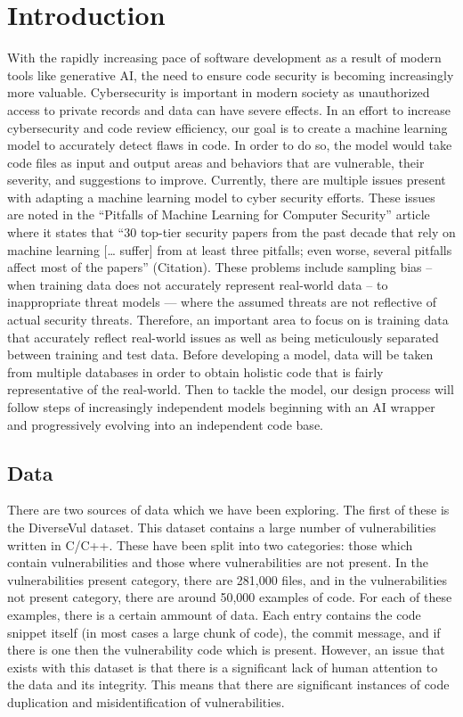\documentclass{article}
\begin{document}
\section{Introduction}
With the rapidly increasing pace of software development as a result of modern tools like generative AI, the need to ensure code security is becoming increasingly more valuable. Cybersecurity is important in modern society as unauthorized access to private records and data can have severe effects. In an effort to increase cybersecurity and code review efficiency, our goal is to create a machine learning model to accurately detect flaws in code. In order to do so, the model would take code files as input and output areas and behaviors that are vulnerable, their severity, and suggestions to improve. Currently, there are multiple issues present with adapting a machine learning model to cyber security efforts. These issues are noted in the “Pitfalls of Machine Learning for Computer Security” article where it states that “30 top-tier security papers from the past decade that rely on machine learning [… suffer] from at least three pitfalls; even worse, several pitfalls affect most of the papers” (Citation). These problems include sampling bias – when training data does not accurately represent real-world data – to inappropriate threat models — where the assumed threats are not reflective of actual security threats. Therefore, an important area to focus on is training data that accurately reflect real-world issues as well as being meticulously separated between training and test data. Before developing a model, data will be taken from multiple databases in order to obtain holistic code that is fairly representative of the real-world. Then to tackle the model, our design process will follow steps of increasingly independent models beginning with an AI wrapper and progressively evolving into an independent code base.


\subsection{Data}
There are two sources of data which we have been exploring. The first of these is the 
DiverseVul dataset. This dataset contains a large number of vulnerabilities written in C/C++.
These have been split into two categories: those which contain vulnerabilities and those
where vulnerabilities are not present. In the vulnerabilities present category, there are 
281,000 files, and in the vulnerabilities not present category, there are around 50,000
examples of code. For each of these examples, there is a certain ammount of data. Each entry
contains the code snippet itself (in most cases a large chunk of code), the commit message, and if there is one then the vulnerability code which is present. However, an issue that exists
with this dataset is that there is a significant lack of human attention to the data
and its integrity. This means that there are significant instances of code duplication and
misidentification of vulnerabilities.
\end{document}
